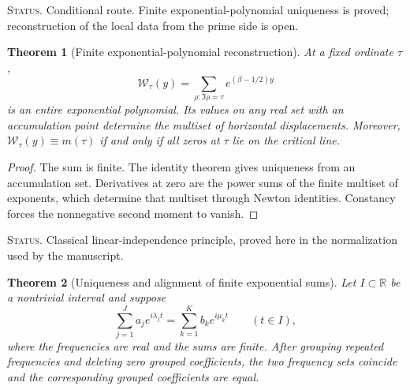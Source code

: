 \documentclass[11pt]{amsart}
\numberwithin{equation}{section}
\theoremstyle{plain}
\newtheorem{theorem}{Theorem}[section]
\theoremstyle{definition}
\theoremstyle{remark}
\newcommand{\1}{\mathbf{1}}
\newcommand{\statusnote}[1]{%
  \par\smallskip\noindent
  \begingroup\footnotesize\textsc{Status.} #1\endgroup
  \par\smallskip}
\begin{document}
\statusnote{Conditional route.  Finite exponential-polynomial uniqueness is proved; reconstruction of the local data from the prime side is open.}
\begin{theorem}[Finite exponential-polynomial reconstruction]
\label{thm:q_family_reconstruction}
At a fixed ordinate $\tau$,
\begin{equation}
\mathcal W_\tau(y)
=
\sum_{\rho:\Im\rho=\tau}e^{(\beta-1/2)y}
\label{eq:q_family_exponential_polynomial}
\end{equation}
is an entire exponential polynomial.  Its values on any real set with an
accumulation point determine the multiset of horizontal displacements.
Moreover, $\mathcal W_\tau(y)\equiv m(\tau)$ if and only if all zeros at
$\tau$ lie on the critical line.
\end{theorem}

\begin{proof}
The sum is finite.  The identity theorem gives uniqueness from an
accumulation set.  Derivatives at zero are the power sums of the finite
multiset of exponents, which determine that multiset through Newton
identities.  Constancy forces the nonnegative second moment to vanish.
\end{proof}

\statusnote{Classical linear-independence principle, proved here in the normalization used by the manuscript.}
\begin{theorem}[Uniqueness and alignment of finite exponential sums]
\label{thm:finite_exponential_alignment}
Let \(I\subset\mathbb R\) be a nontrivial interval and suppose
\begin{equation}
\sum_{j=1}^{J}a_je^{i\lambda_jt}
=
\sum_{k=1}^{K}b_ke^{i\mu_kt}
\qquad(t\in I),
\label{eq:finite_exponential_equality_interval}
\end{equation}
where the frequencies are real and the sums are finite.  After grouping
repeated frequencies and deleting zero grouped coefficients, the two
frequency sets coincide and the corresponding grouped coefficients are
equal.
\end{theorem}
\end{document}

